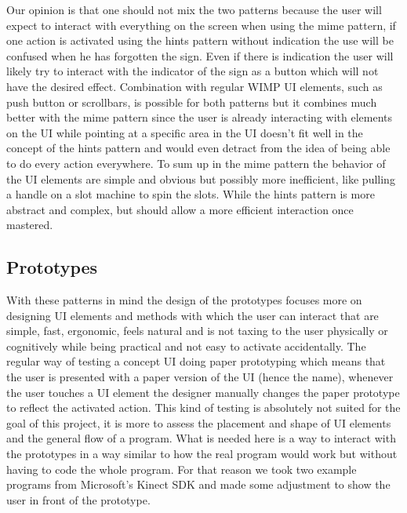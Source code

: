 Our opinion is that one should not mix the two patterns because the user will expect to interact with everything on the screen when using the mime pattern, if one action is activated using the hints pattern without indication the use will be confused when he has forgotten the sign. Even if there is indication the user will likely try to interact with the indicator of the sign as a button which will not have the desired effect. Combination with regular WIMP UI elements, such as push button or scrollbars, is possible for both patterns but it combines much better with the mime pattern since the user is already interacting with elements on the UI while pointing at a specific area in the UI doesn't fit well in the concept of the hints pattern and would even detract from the idea of being able to do every action everywhere. To sum up in the mime pattern the behavior of the UI elements are simple and obvious but possibly more inefficient, like pulling a handle on a slot machine to spin the slots. While the hints pattern is more abstract and complex, but should allow a more efficient interaction once mastered.


\subsection{Prototypes}

With these patterns in mind the design of the prototypes focuses more on designing UI elements and methods with which the user can interact that are simple, fast, ergonomic, feels natural and is not taxing to the user physically or cognitively while being practical and not easy to activate accidentally. The regular way of testing a concept UI doing paper prototyping which means that the user is presented with a paper version of the UI (hence the name), whenever the user touches a UI element the designer manually changes the paper prototype to reflect the activated action. This kind of testing is absolutely not suited for the goal of this project, it is more to assess the placement and shape of UI elements and the general flow of a program. What is needed here is a way to interact with the prototypes in a way similar to how the real program would work but without having to code the whole program. For that reason we took two example programs from Microsoft's Kinect SDK and made some adjustment to show the user in front of the prototype. 

